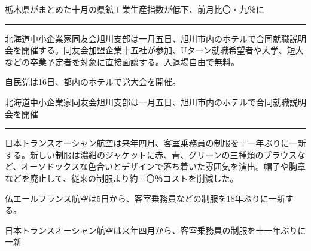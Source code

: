 \documentclass[japanese]{jnlp_1.4}
\begin{document}

\begin{InL}
栃木県がまとめた十月の県鉱工業生産指数が低下、前月比〇・九％に
\end{InL}

\vspace{0.5\baselineskip}
\hrule
\vspace{0.5\baselineskip}


\begin{InL}
北海道中小企業家同友会旭川支部は一月五日、旭川市内のホテルで合同就職説明会を開催する。同友会加盟企業十五社が参加、Uターン就職希望者や大学、短大などの卒業予定者を対象に直接面談する。入退場自由で無料。
\end{InL}


\begin{InL}
自民党は16日、都内のホテルで党大会を開催。
\end{InL}


\begin{InL}
北海道中小企業家同友会旭川支部は一月五日、旭川市内のホテルで合同就職説明会を開催
\end{InL}

\vspace{0.5\baselineskip}
\hrule
\vspace{0.5\baselineskip}


\begin{InL}
日本トランスオーシャン航空は来年四月、客室乗務員の制服を十一年ぶりに一新する。新しい制服は濃紺のジャケットに赤、青、グリーンの三種類のブラウスなど、オーソドックスな色合いとデザインで落ち着いた雰囲気を演出。帽子や胸章などを廃止して、従来の制服より約三〇％コストを削減した。
\end{InL}


\begin{InL}
仏エールフランス航空は5日から、客室乗務員などの制服を18年ぶりに一新する。
\end{InL}


\begin{InL}
日本トランスオーシャン航空は来年四月から、客室乗務員の制服を十一年ぶりに一新
\end{InL}
\end{document}
